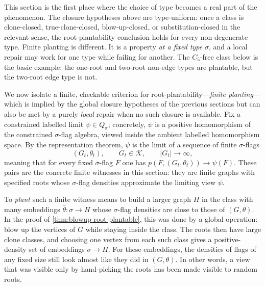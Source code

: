 \documentclass[11pt]{article}
\theoremstyle{definition}
\newcommand{\K}{\mathcal{K}}
\begin{document}
This section is the first place where the choice of type becomes a real part of the
phenomenon.  The closure hypotheses above are type-uniform: once a class is clone-closed,
true-clone-closed, blow-up-closed, or substitution-closed in the relevant sense, the
root-plantability conclusion holds for every non-degenerate type.  Finite planting is
different.  It is a property \emph{at a fixed type} $\sigma$, and a local repair may work
for one type while failing for another.  The $C_5$-free class below is the basic example:
the one-root and two-root non-edge types are plantable, but the two-root edge type is not.

We now isolate a finite, checkable criterion for root-plantability---\emph{finite
planting}---which is implied by the global closure hypotheses of the previous sections but
can also be met by a purely \emph{local} repair when no such closure is available.  Fix a
constrained
labelled limit $\psi\in Q_\sigma$; concretely, $\psi$ is a positive homomorphism of the
constrained $\sigma$-flag algebra, viewed inside the ambient labelled homomorphism space.
By the representation theorem, $\psi$ is the limit of a sequence of finite
$\sigma$-flags
\[
  (G_t,\theta_t),\qquad G_t\in\K,\qquad |G_t|\to\infty,
\]
meaning that for every fixed $\sigma$-flag $F$ one has
$p(F,(G_t,\theta_t))\to\psi(F)$.  These pairs are the concrete finite witnesses in
this section: they are finite graphs with specified roots whose $\sigma$-flag densities approximate the
limiting view $\psi$.

To \emph{plant} such a finite witness means to build a larger graph $H$ in the class with
many embeddings $\widehat\theta:\sigma\to H$ whose $\sigma$-flag densities are close to
those of $(G,\theta)$.  In the proof of \cref{thm:blowup-root-plantable}, this was done
by a global operation: blow up the vertices of $G$ while staying inside the class.  The
roots then have large clone classes, and choosing one vertex from each such
class gives a positive-density set of embeddings $\sigma\to H$.  For these embeddings, the
densities of flags of any fixed size still look almost like they did in $(G,\theta)$.
In other words, a view that was visible only by hand-picking the roots has been made
visible to random roots.
\end{document}
